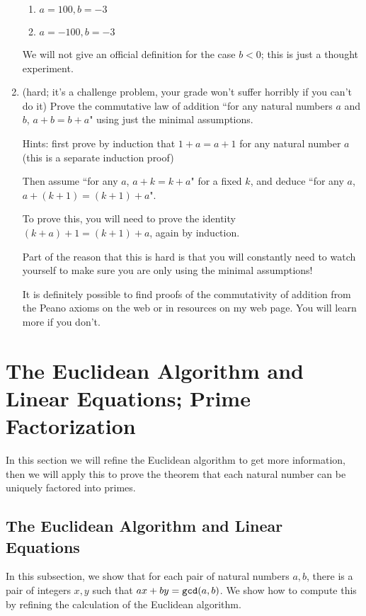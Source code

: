 \documentclass[12pt]{article}
\begin{document}
\begin{enumerate}
\begin {enumerate}

\item  $a=100, b=-3$

\item $a=-100, b=-3$

\end{enumerate}

We will not give an official definition for the case $b<0$; this is just a thought experiment.

\item (hard; it's a challenge problem, your grade won't suffer horribly if you can't do it)  Prove the commutative law of addition ``for any natural numbers $a$ and $b$, $a+b=b+a$"  using just the minimal assumptions.   

Hints:  first prove by induction that $1+a=a+1$ for any natural number $a$ (this is a separate induction proof) 

 Then assume
``for any $a$, $a+k=k+a$"  for a fixed $k$, and deduce ``for any $a$, $a+(k+1) = (k+1)+a$".  

 To prove
this, you will need to prove the identity $(k+a)+1=(k+1)+a$, again by induction.

Part of the reason that this is hard is that you will constantly need to watch yourself to make sure you are only using the minimal assumptions!

It is definitely possible to find proofs of the commutativity of addition from the Peano axioms on the web or in resources on my web page.   You will learn more if you don't.


\end{enumerate}



\section{The Euclidean Algorithm and Linear Equations;  Prime Factorization}

In this section we will refine the Euclidean algorithm to get more information, then we will apply this to prove the theorem that each natural number can be uniquely factored into primes.

\subsection{The Euclidean Algorithm and Linear Equations}

In this subsection, we show that for each pair of natural numbers $a,b$, there is a pair of integers $x,y$ such
that $ax+by={\tt gcd}(a,b)$.  We show how to compute this by refining the calculation of the Euclidean algorithm.
\end{document}
